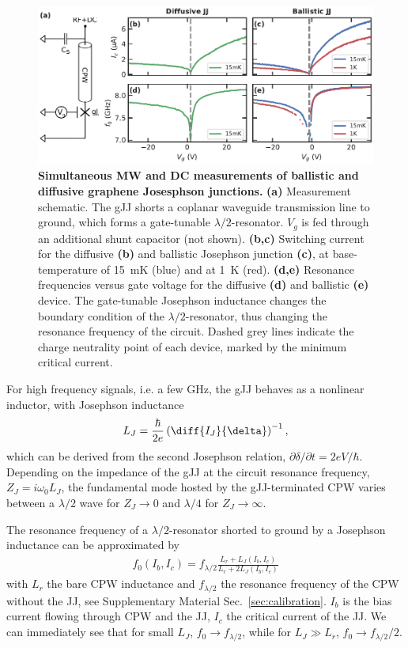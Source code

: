 \begin{figure}[t]
	\centering
	\includegraphics[width=\linewidth]{chapter-gJJ-CPR/figs/Figure1}
	\caption{
		\textbf{Simultaneous MW and DC measurements of ballistic and diffusive graphene Josesphson junctions.}
		\textbf{(a)} Measurement schematic.
		The gJJ shorts a coplanar waveguide transmission line to ground, which forms a gate-tunable $\lambda/2$-resonator.
		$V_g$ is fed through an additional shunt capacitor (not shown).
		\textbf{(b,c)} Switching current for the diffusive \textbf{(b)} and ballistic Josephson junction \textbf{(c)}, at base-temperature of \SI{15}{\milli\kelvin} (blue) and at \SI{1}{\kelvin} (red).
		\textbf{(d,e)} Resonance frequencies versus gate voltage for the diffusive \textbf{(d)} and ballistic \textbf{(e)} device.
		The gate-tunable Josephson inductance changes the boundary condition of the $\lambda/2$-resonator, thus changing the resonance frequency of the circuit.
		Dashed grey lines indicate the charge neutrality point of each device, marked by the minimum critical current.
	}
	\label{fig:figure1}
\end{figure}

For high frequency signals, i.e. a few \si{\giga\hertz}, the gJJ behaves as a nonlinear inductor, with Josephson inductance
%
\begin{align}
L_J = \frac{\hbar}{2e}\left(\diff{I_J}{\delta}\right)^{-1},
\label{eq:LJgeneral}
\end{align}
%
which can be derived from the second Josephson relation, $\partial\delta/\partial t=2e V/\hbar$.
%
Depending on the impedance of the gJJ at the circuit resonance frequency, $Z_J=i\omega_0 L_J$, the fundamental mode hosted by the gJJ-terminated CPW varies between a $\lambda/2$ wave for $Z_J\rightarrow0$ and $\lambda/4$ for $Z_J\rightarrow\infty$.

The resonance frequency of a $\lambda/2$-resonator shorted to ground by a Josephson inductance can be approximated by
\begin{align}
f_0\left(I_b,I_c\right) = f_{\lambda/2} \frac{L_r+L_J\left(I_b, I_c\right)}{L_r +  2L_J\left(I_b, I_c\right)}
\label{eq:Pogorzalek}
\end{align}
%
with $L_r$ the bare CPW inductance and $f_{\lambda/2}$ the resonance frequency of the CPW without the JJ, see Supplementary Material Sec.~\ref{sec:calibration}.
%
$I_b$ is the bias current flowing through CPW and the JJ, $I_c$ the critical current of the JJ.
%
We can immediately see that for small $L_J$, $f_0\rightarrow f_{\lambda/2}$, while for $L_J\gg L_r$, $f_0 \rightarrow f_{\lambda/2}/2$.

